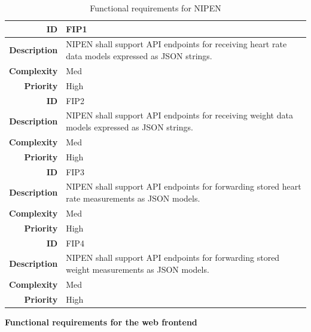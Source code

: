 \begin{table}[h]
\begin{center}
\begin{tabular}{ | r | p{11.5cm} | }
  \hline

  \textbf{ID} & FIP1 \\
  \hline\noalign{\smallskip}\hline
  \textbf{Description}  & NIPEN shall support API endpoints for receiving heart rate data
                          models expressed as JSON strings.\\
  \textbf{Complexity}   & Med \\
  \textbf{Priority}     & High \\
  \hline\noalign{\smallskip}\noalign{\smallskip}\hline

  \textbf{ID} & FIP2 \\
  \hline\noalign{\smallskip}\hline
  \textbf{Description}  & NIPEN shall support API endpoints for receiving
                          weight data models expressed as JSON strings.\\
  \textbf{Complexity}   & Med \\
  \textbf{Priority}     & High \\
  \hline\noalign{\smallskip}\noalign{\smallskip}\hline

  \textbf{ID} & FIP3 \\
  \hline\noalign{\smallskip}\hline
  \textbf{Description}  & NIPEN shall support API endpoints for forwarding
                          stored heart rate measurements as JSON models.\\
  \textbf{Complexity}   & Med \\
  \textbf{Priority}     & High \\
  \hline\noalign{\smallskip}\noalign{\smallskip}\hline

  \textbf{ID} & FIP4 \\
  \hline\noalign{\smallskip}\hline
  \textbf{Description}  & NIPEN shall support API endpoints for forwarding
                          stored weight measurements as JSON models.\\
  \textbf{Complexity}   & Med \\
  \textbf{Priority}     & High \\

  \hline
\end{tabular}
\end{center}
\caption{Functional requirements for NIPEN}
\label{table:reqip}
\end{table}

\textbf{Functional requirements for the web frontend}

